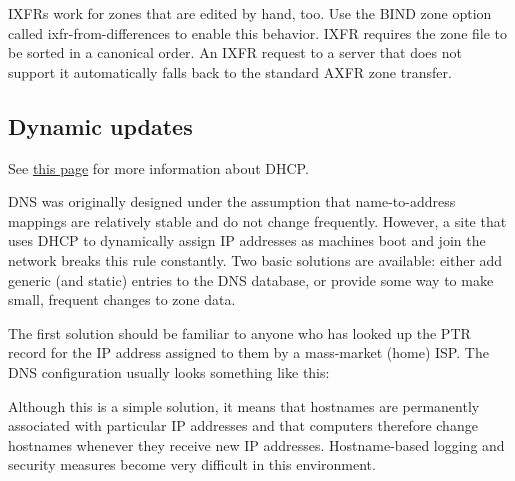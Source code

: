 
IXFRs work for zones that are edited by hand, too. Use the BIND zone
option called {ixfr-from-differences} to enable this behavior. IXFR
requires the zone file to be sorted in a canonical order. An IXFR
request to a server that does not support it automatically falls back to
the standard AXFR zone transfer.

\protect\hypertarget{part0024_split_052.html}{}{}

\hypertarget{part0024_split_052.htmlux5cux23_idContainer1069}{}
\hypertarget{part0024_split_052.htmlux5cux23calibre_pb_51}{%
\subsection[Dynamic
updates]{\texorpdfstring{\protect\hypertarget{part0024_split_052.htmlux5cux23_idTextAnchor928}{}{}Dynamic
updates}{Dynamic updates}}\label{part0024_split_052.htmlux5cux23calibre_pb_51}}

\leavevmode\hypertarget{part0024_split_052.htmlux5cux23_idContainer1015}{}%
See
\protect\hyperlink{part0021_split_027.htmlux5cux23_idTextAnchor674}{this
page} for more information about DHCP.

\protect\hypertarget{part0024_split_052.htmlux5cux23_idIndexMarker2224}{}{}\protect\hypertarget{part0024_split_052.htmlux5cux23_idIndexMarker2225}{}{}DNS
was originally designed under the assumption that name-to-address
\protect\hypertarget{part0024_split_052.htmlux5cux23_idIndexMarker2226}{}{}mappings
are relatively stable and do not change frequently. However, a site that
uses DHCP to dynamically assign IP addresses as machines boot and join
the network breaks this rule constantly. Two basic solutions are
available: either add generic (and static) entries to the DNS database,
or provide some way to make small, frequent changes to zone data.

The first solution should be familiar to anyone who has looked up the
PTR record for the IP address assigned to them by a mass-market (home)
ISP. The DNS configuration usually looks something like this:


Although this is a simple solution, it means that hostnames are
permanently associated with particular IP addresses and that computers
therefore change {hostnames} whenever they receive new IP addresses.
Hostname-based logging and security measures become very difficult in
this environment.

